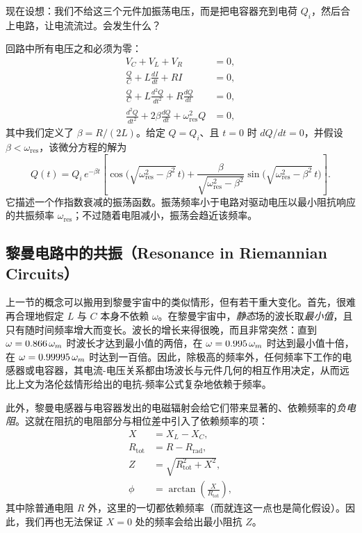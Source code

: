 现在设想：我们不给这三个元件加振荡电压，而是把电容器充到电荷 $Q_{i}$，然后合上电路，让电流流过。会发生什么？

回路中所有电压之和必须为零：
\begin{align}
V_{C}+V_{L}+V_{R} &= 0,\\
\frac{Q}{C}+L\frac{dI}{dt}+RI &= 0,\\
\frac{Q}{C}+L\frac{d^{2}Q}{dt^{2}}+R\frac{dQ}{dt} &= 0,\\
\frac{d^{2}Q}{dt^{2}}+2\beta\frac{dQ}{dt}+\omega_{\text{res}}^{2}Q &= 0,
\end{align}
其中我们定义了 $\beta=R/(2L)$。给定 $Q=Q_{i}$、且 $t=0$ 时 $dQ/dt=0$，并假设 $\beta<\omega_{\text{res}}$，该微分方程的解为
\begin{equation}
Q(t) = Q_{i}\,e^{-\beta t}\left[\cos\!\bigl(\sqrt{\omega_{\text{res}}^{2}-\beta^{2}}\,t\bigr)+\frac{\beta}{\sqrt{\omega_{\text{res}}^{2}-\beta^{2}}}\sin\!\bigl(\sqrt{\omega_{\text{res}}^{2}-\beta^{2}}\,t\bigr)\right].
\end{equation}
它描述一个作指数衰减的振荡函数。振荡频率小于电路对驱动电压以最小阻抗响应的共振频率 $\omega_{\text{res}}$；不过随着电阻减小，振荡会趋近该频率。

\subsection{黎曼电路中的共振（Resonance in Riemannian Circuits）}

上一节的概念可以搬用到黎曼宇宙中的类似情形，但有若干重大变化。首先，很难再合理地假定 $L$ 与 $C$ 本身不依赖 $\omega$。在黎曼宇宙中，\emph{静态}场的波长取\emph{最小值}，且只有随时间频率增大而变长。波长的增长来得很晚，而且非常突然：直到 $\omega=0.866\,\omega_m$ 时波长才达到最小值的两倍，在 $\omega=0.995\,\omega_m$ 时达到最小值十倍，在 $\omega=0.99995\,\omega_m$ 时达到一百倍。因此，除极高的频率外，任何频率下工作的电感器或电容器，其电流-电压关系都由场波长与元件几何的相互作用决定，从而远比上文为洛伦兹情形给出的电抗-频率公式复杂地依赖于频率。

此外，黎曼电感器与电容器发出的电磁辐射会给它们带来显著的、依赖频率的\emph{负电阻}。这就在阻抗的电阻部分与相位差中引入了依赖频率的项：
\begin{align}
X &= X_{L}-X_{C},\\
R_{\text{tot}} &= R-R_{\text{rad}},\\
Z &= \sqrt{R_{\text{tot}}^{2}+X^{2}},\\
\phi &= \arctan\!\left(\frac{X}{R_{\text{tot}}}\right),
\end{align}
其中除普通电阻 $R$ 外，这里的一切都依赖频率（而就连这一点也是简化假设）。因此，我们再也无法保证 $X=0$ 处的频率会给出最小阻抗 $Z$。

